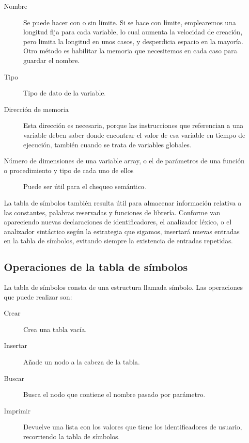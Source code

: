 \documentclass[11pt, english]{article}
\begin{document}
	\begin{description}
		
		\item[Nombre] Se puede hacer con o sin límite. Si se hace con límite, emplearemos una longitud fija para cada variable, lo cual aumenta la velocidad de creación, pero limita la longitud en unos casos, y desperdicia espacio en la mayoría. Otro método es habilitar la memoria que necesitemos en cada caso para guardar el nombre.\newline
		\item[Tipo] Tipo de dato de la variable.\newline
		\item[Dirección de memoria] Esta dirección es necesaria, porque las instrucciones que referencian a una variable deben saber donde encontrar el valor de esa variable en tiempo de ejecución, también cuando se trata de variables globales.\newline
		\item[Número de dimensiones de una variable array, o el de parámetros de una función o procedimiento y tipo de cada uno de ellos] Puede ser útil para el chequeo semántico.\newline
		
	\end{description}
	
	La tabla de símbolos también resulta útil para almacenar información relativa a las constantes, palabras reservadas y funciones de librería. Conforme van apareciendo nuevas declaraciones de identificadores, el analizador léxico, o el analizador sintáctico según la estrategia que sigamos, insertará nuevas entradas en la tabla de símbolos, evitando siempre la existencia de entradas repetidas.

	\newpage
	
	\subsection{Operaciones de la tabla de símbolos}

	La tabla de símbolos consta de una estructura llamada símbolo. Las operaciones que puede realizar son:
	
	\begin{description}
		
		\item[Crear] Crea una tabla vacía.\newline
		\item[Insertar] Añade un nodo a la cabeza de la tabla.\newline
		\item[Buscar] Busca el nodo que contiene el nombre pasado por parámetro.\newline
		\item[Imprimir] Devuelve una lista con los valores que tiene los identificadores de usuario, recorriendo la tabla de símbolos.\newline
		
	\end{description}
\end{document}

